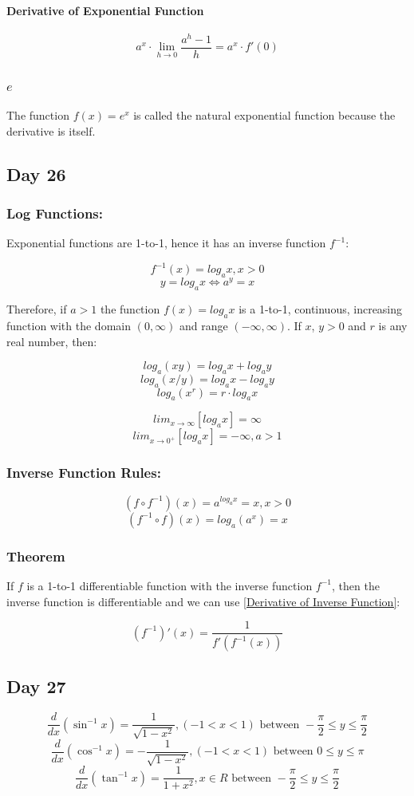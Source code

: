 \documentclass[12pt]{article}
\begin{document}
\paragraph{Derivative of Exponential Function}
$$a^x \cdot \lim_{h\to0} \frac{a^h-1}{h} = a^x \cdot f'(0)$$

\subsubsection{$e$}
The function $f(x)=e^x$ is called the natural exponential function because the derivative is itself.

\subsection{Day 26}
\subsubsection{Log Functions:} Exponential functions are 1-to-1, hence it has an inverse function $f^{-1}$:

$$f^{-1} (x) = log_a x, x>0$$
$$y=log_a x \iff a^y = x$$

\noindent Therefore, if $a>1$ the function $f(x)=log_a x$ is a 1-to-1, continuous, increasing function with the domain $(0, \infty)$ and range $(-\infty, \infty)$. If $x$, $y>0$ and $r$ is any real number, then:

$$log_a(xy)=log_a x + log_a y$$
$$log_a(x/y)=log_a x - log_a y$$
$$log_a(x^r)=r\cdot log_a x$$

$$lim_{x\to \infty} [log_a x] = \infty$$
$$lim_{x\to 0^+} [log_a x] = -\infty, a > 1$$

\subsubsection{Inverse Function Rules:}

$$(f \circ f^{-1})(x) = a^{log_a x} = x, x>0$$
$$(f^{-1} \circ f)(x) = log_a (a^x) = x$$

\subsubsection{Theorem} If $f$ is a 1-to-1 differentiable function with the inverse function $f^{-1}$, then the inverse function is differentiable and we can use \ref{Derivative of Inverse Function}: 

$$(f^{-1})'(x) = \frac{1}{f'(f^{-1}(x))}$$

\subsection{Day 27}
$$\frac{d}{dx} \left( \sin^{-1} x \right) = \frac{1}{\sqrt{1-x^2}}, (-1 < x < 1) \text{ between } -\frac{\pi}{2} \leq y \leq \frac{\pi}{2}$$
$$\frac{d}{dx} \left( \cos^{-1} x \right) = -\frac{1}{\sqrt{1-x^2}}, (-1 < x < 1)  \text{ between } 0 \leq y \leq \pi$$
$$\frac{d}{dx} \left( \tan^{-1} x \right) = \frac{1}{1+x^2}, x \in {\mathbb{} R}\text{ between } -\frac{\pi}{2} \leq y \leq \frac{\pi}{2}$$
\end{document}
